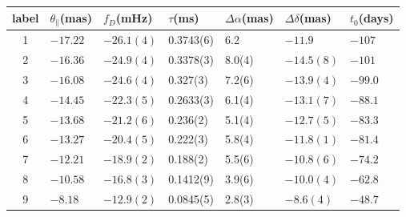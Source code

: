 \documentclass[useAMS,usenatbib]{mn2e}
\begin{document}
\begin{table}
\centering
\begin{tabular}{c|llllll}
\hline
label & $\theta_{\parallel}$(mas) & $f_D$(mHz) & $\tau$(ms)  & $\Delta\alpha$(mas) & $\Delta\delta$(mas) & $t_0$(days)\\
\hline
1& $-17.22$   & $-26.1(4)$    & 0.3743(6)         & 6.2    & $-11.9$      & $-107$                               \\
2& $-16.36$  & $-24.9(4)$      & 0.3378(3)         & 8.0(4)  & $-14.5(8)$      &$-101$                                \\
3& $-16.08$   & $-24.6(4)$       & 0.327(3)   & 7.2(6)  & $-13.9(4)$       & $-99.0$                                \\
4& $-14.45$   & $-22.3(5)$      & 0.2633(3)    & 6.1(4)  & $-13.1(7)$     & $-88.1$                                \\
5& $-13.68$ & $-21.2(6)$        & 0.236(2)    & 5.1(4)  & $-12.7(5)$      & $-83.3$                                \\
6& $-13.27$ & $-20.4(5)$      & 0.222(3)     & 5.8(4)  & $-11.8(1)$    & $-81.4$                                \\
7& $-12.21$   & $-18.9(2)$      & 0.188(2)   & 5.5(6) & $-10.8(6)$      & $-74.2$                        \\
8& $-10.58$   & $-16.8(3)$      & 0.1412(9)  & 3.9(6) & $-10.0(4)$      & $-62.8$                                \\
9& $-8.18$   & $-12.9(2)$      & 0.0845(5) & 2.8(3)  & $-8.6(4)$      & $-48.7$                                
\\ \hline


\end{tabular}
\end{table}
\end{document}

